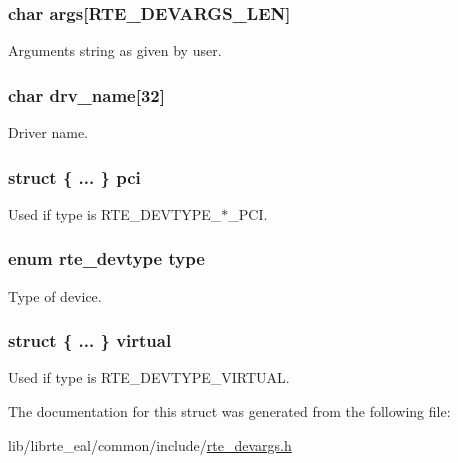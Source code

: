 \subsubsection[{args}]{\setlength{\rightskip}{0pt plus 5cm}char args\mbox{[}R\+T\+E\+\_\+\+D\+E\+V\+A\+R\+G\+S\+\_\+\+L\+E\+N\mbox{]}}\label{structrte__devargs_ac8d946f012675cf93396b453c96d07da}
Arguments string as given by user. \hypertarget{structrte__devargs_a1764942a3f4ef98f96b56f34528c8896}{}
\subsubsection[{drv\+\_\+name}]{\setlength{\rightskip}{0pt plus 5cm}char drv\+\_\+name\mbox{[}32\mbox{]}}\label{structrte__devargs_a1764942a3f4ef98f96b56f34528c8896}
Driver name. \hypertarget{structrte__devargs_ae26812bc74640366c15cde4f2d4b4926}{}
\subsubsection[{pci}]{\setlength{\rightskip}{0pt plus 5cm}struct \{ ... \}   pci}\label{structrte__devargs_ae26812bc74640366c15cde4f2d4b4926}
Used if type is R\+T\+E\+\_\+\+D\+E\+V\+T\+Y\+P\+E\+\_\+$\ast$\+\_\+\+P\+C\+I. \hypertarget{structrte__devargs_ad24886fe74539d51dfc8be0cb7a06cfc}{}
\subsubsection[{type}]{\setlength{\rightskip}{0pt plus 5cm}enum {\bf rte\+\_\+devtype} type}\label{structrte__devargs_ad24886fe74539d51dfc8be0cb7a06cfc}
Type of device. \hypertarget{structrte__devargs_acf02e25b6dc010c2369b80615055b5b4}{}
\subsubsection[{virtual}]{\setlength{\rightskip}{0pt plus 5cm}struct \{ ... \}   virtual}\label{structrte__devargs_acf02e25b6dc010c2369b80615055b5b4}
Used if type is R\+T\+E\+\_\+\+D\+E\+V\+T\+Y\+P\+E\+\_\+\+V\+I\+R\+T\+U\+A\+L. 

The documentation for this struct was generated from the following file\+:\begin{DoxyCompactItemize}
\item 
lib/librte\+\_\+eal/common/include/\hyperlink{rte__devargs_8h}{rte\+\_\+devargs.\+h}\end{DoxyCompactItemize}
